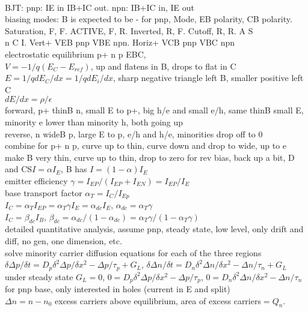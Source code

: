\documentclass{article}
\begin{document}
\\BJT: pnp: IE in IB+IC out. npn: IB+IC in, IE out
\\biasing modes: B is expected to be - for pnp, Mode, EB polarity, CB polarity. Saturation, F, F. ACTIVE, F, R. Inverted, R, F. Cutoff, R, R. A S \\n C I. Vert+ VEB pnp VBE npn. Horiz+ VCB pnp VBC npn
\\electrostatic equilibrium p+ n p EBC, 
\\$V=-1/q(E_C-E_{ref})$, up and flatens in B, drops to flat in C
\\$E=1/q dE_C/dx=1/q dE_i/dx$, sharp negative triangle left B, smaller positive left C
\\$dE/dx=\rho/\epsilon$
\\forward, p+ thinB n, small E to p+, big h/e and small e/h, same thinB small E, minority e lower than minority h, both going up
\\reverse, n wideB p, large E to p, e/h and h/e, minorities drop off to 0
\\combine for p+ n p, curve up to thin, curve down and drop to wide, up to e
\\make B very thin, curve up to thin, drop to zero for rev bias, back up a bit, D and CS$I=\alpha I_E$, B has $I=(1-\alpha)I_E$
\\emitter efficiency $\gamma=I_{EP}/(I_{EP}+I_{EN})=I_{EP}/I_E$
\\base transport factor $\alpha_T=I_C/I_{Ep}$
\\$I_C=\alpha_TI_{EP}=\alpha_T\gamma I_E=\alpha_{dc}I_E$, $\alpha_{dc}=\alpha_T\gamma$
\\$I_C=\beta_{dc}I_B$, $\beta_{dc}=\alpha_{dc}/(1-\alpha_{dc})=\alpha_T\gamma/(1-\alpha_T\gamma)$
\\detailed quantitative analysis, assume pnp, steady state, low level, only drift and diff, no gen, one dimension, etc.
\\solve minority carrier diffusion equations for each of the three regions
\\$\delta\Delta p/\delta t=D_p \delta^2\Delta p/\delta x^2-\Delta p/\tau_p+G_L$, $\delta\Delta n/\delta t=D_n \delta^2\Delta n/\delta x^2-\Delta n/\tau_n+G_L$
\\under steady state $G_L=0$, $0=D_p \delta^2\Delta p/\delta x^2-\Delta p/\tau_p$, $0=D_n \delta^2\Delta n/\delta x^2-\Delta n/\tau_n$
\\for pnp base, only interested in holes (current in E and split)
\\$\Delta n=n-n_0$ excess carriers above equilibrium, area of excess carriers$=Q_n$. 
\end{document}
